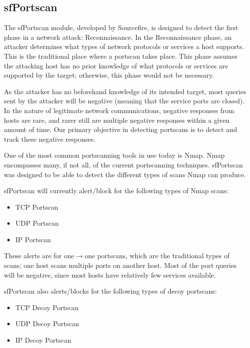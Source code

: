 \documentclass[english]{report}
\begin{document}
\subsection{sfPortscan}

The sfPortscan module, developed by Sourcefire, is designed to detect the first
phase in a network attack: Reconnaissance. In the Reconnaissance phase, an
attacker determines what types of network protocols or services a host
supports. This is the traditional place where a portscan takes place. This
phase assumes the attacking host has no prior knowledge of what protocols or
services are supported by the target; otherwise, this phase would not be
necessary.

As the attacker has no beforehand knowledge of its intended target, most
queries sent by the attacker will be negative (meaning that the service ports
are closed). In the nature of legitimate network communications, negative
responses from hosts are rare, and rarer still are multiple negative responses
within a given amount of time.  Our primary objective in detecting portscans is
to detect and track these negative responses.

One of the most common portscanning tools in use today is Nmap. Nmap
encompasses many, if not all, of the current portscanning techniques.
sfPortscan was designed to be able to detect the different types of scans Nmap
can produce.

sfPortscan will currently alert/block for the following types of Nmap scans:

\begin{itemize}
\item TCP Portscan
\item UDP Portscan
\item IP Portscan
\end{itemize}

These alerts are for one$\rightarrow$one portscans, which are the traditional
types of scans; one host scans multiple ports on another host. Most of the port
queries will be negative, since most hosts have relatively few services
available.

sfPortscan also alerts/blocks for the following types of decoy portscans:

\begin{itemize}
\item TCP Decoy Portscan
\item UDP Decoy Portscan
\item IP Decoy Portscan
\end{itemize}
\end{document}
